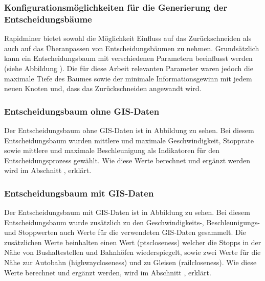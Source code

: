\subsubsection{Konfigurationsmöglichkeiten für die Generierung der Entscheidungsbäume}
Rapidminer bietet sowohl die Möglichkeit Einfluss auf das Zurückschneiden als auch auf das Überanpassen von Entscheidungsbäumen zu nehmen. Grundsätzlich kann ein Entscheidungsbaum mit verschiedenen Parametern beeinflusst werden (siehe Abbildung ). Die für diese Arbeit relevanten Parameter waren jedoch die maximale Tiefe des Baumes sowie der minimale Informationsgewinn mit jedem neuen Knoten und, dass das Zurückschneiden angewandt wird. 


\subsubsection{Entscheidungsbaum ohne GIS-Daten}
\label{entscheidungsbaum}
Der Entscheidungsbaum ohne GIS-Daten ist in Abbildung  zu sehen. Bei diesem Entscheidungsbaum wurden mittlere und maximale Geschwindigkeit, Stopprate sowie mittlere und maximale Beschleunigung als Indikatoren für den Entscheidungsprozess gewählt. Wie diese Werte berechnet und ergänzt werden wird im Abschnitt , erklärt. 

\clearpage

\subsubsection{Entscheidungsbaum mit GIS-Daten}
\label{entscheidungsbaumGIS}
Der Entscheidungsbaum mit GIS-Daten ist in Abbildung  zu sehen. Bei diesem Entscheidungsbaum wurde zusätzlich zu den Geschwindigkeits-, Beschleunigungs- und Stoppwerten auch Werte für die verwendeten GIS-Daten gesammelt. Die zusätzlichen Werte beinhalten einen Wert (ptscloseness) welcher die Stopps in der Nähe von Bushaltestellen und Bahnhöfen wiederspiegelt, sowie zwei Werte für die Nähe zur Autobahn (highwaycloseness) und zu Gleisen (railcloseness). Wie diese Werte berechnet und ergänzt werden, wird im Abschnitt , erklärt.

